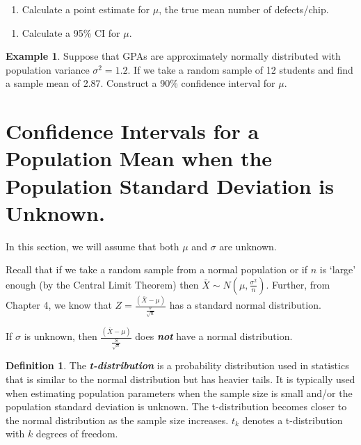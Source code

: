 \documentclass[
  11pt,
  oneside]{book}
\providecommand{\tightlist}{%
  \setlength{\itemsep}{0pt}\setlength{\parskip}{0pt}}
\theoremstyle{definition}
\newtheorem{definition}{Definition}[chapter]
\theoremstyle{definition}
\newtheorem{example}{Example}[chapter]
\theoremstyle{definition}
\theoremstyle{definition}
\theoremstyle{remark}
\begin{document}
\begin{enumerate}
\def\labelenumi{(\alph{enumi})}
\tightlist
\item
  Calculate a point estimate for \(\mu\), the true mean number of defects/chip.
\end{enumerate}

\vfill

\begin{enumerate}
\def\labelenumi{(\alph{enumi})}
\setcounter{enumi}{1}
\tightlist
\item
  Calculate a 95\% CI for \(\mu\).
\end{enumerate}

\vfill

\newpage

\begin{example}
Suppose that GPAs are approximately normally distributed with population variance \(\sigma^2=1.2\). If we take a random sample of 12 students and find a sample mean of 2.87. Construct a 90\% confidence interval for \(\mu\).
\end{example}

\vfill

\newpage

\section{Confidence Intervals for a Population Mean when the Population Standard Deviation is Unknown.}\label{confidence-intervals-for-a-population-mean-when-the-population-standard-deviation-is-unknown.}

In this section, we will assume that both \(\mu\) and \(\sigma\) are unknown.

Recall that if we take a random sample from a normal population or if \(n\) is `large' enough (by the Central Limit Theorem) then \(\bar{X} \sim N(\mu, \frac{\sigma^{2}}{n})\). Further, from Chapter 4, we know that \(Z = \frac{(\bar{X}-\mu)}{\frac{\sigma}{\sqrt{n}}}\) has a standard normal distribution.

If \(\sigma\) is unknown, then \(\frac{(\bar{X}-\mu)}{\frac{S}{\sqrt{n}}}\) does \textbf{\emph{not}} have a normal distribution.

\begin{definition}
The \textbf{\emph{t-distribution}} is a probability distribution used in statistics that is similar to the normal distribution but has heavier tails. It is typically used when estimating population parameters when the sample size is small and/or the population standard deviation is unknown. The t-distribution becomes closer to the normal distribution as the sample size increases. \(t_{k}\) denotes a t-distribution with \(k\) degrees of freedom.
\end{definition}
\end{document}
